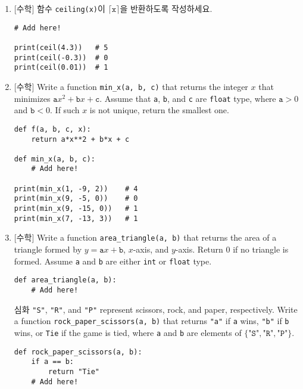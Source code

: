 \documentclass[../main.tex]{subfiles}
\begin{document}
\begin{enumerate}
\item \textsf{[수학]} 함수 \texttt{ceiling(x)}이 $\lceil\texttt{x}\rceil$을
  반환하도록 작성하세요.
\begin{verbatim}
# Add here!

print(ceil(4.3))   # 5
print(ceil(-0.3))  # 0
print(ceil(0.01))  # 1
\end{verbatim}

\item \textsf{[수학]} Write a function \texttt{min\_x(a, b, c)} that returns the integer $x$ that minimizes $\texttt{a}x^2 + \texttt{b}x + \texttt{c}$.
Assume that \texttt{a}, \texttt{b}, and \texttt{c} are \texttt{float} type, where $\texttt{a} > 0$ and $\texttt{b} < 0$.
If such $x$ is not unique, return the smallest one.
\begin{verbatim}
def f(a, b, c, x):
    return a*x**2 + b*x + c

def min_x(a, b, c):
    # Add here!

print(min_x(1, -9, 2))    # 4
print(min_x(9, -5, 0))    # 0
print(min_x(9, -15, 0))   # 1
print(min_x(7, -13, 3))   # 1
\end{verbatim}

\item \textsf{[수학]} Write a function \texttt{area\_triangle(a, b)} that returns the area of a
  triangle formed by $y = \texttt{a}x + \texttt{b}$, $x$-axis, and $y$-axis.
  Return 0 if no triangle is formed. Assume \texttt{a} and \texttt{b} are
  either \texttt{int} or \texttt{float} type.

\begin{verbatim}
def area_triangle(a, b):
    # Add here!

\end{verbatim}

\item[심화] \texttt{"S"}, \texttt{"R"}, and \texttt{"P"} represent scissors, rock,
  and paper, respectively.  Write a function \texttt{rock\_paper\_scissors(a,
  b)} that returns \texttt{"a"} if \texttt{a} wins, \texttt{"b"} if \texttt{b}
  wins, or \texttt{Tie} if the game is tied, where \texttt{a} and \texttt{b}
  are elements of $\{\texttt{"S"}, \texttt{"R"}, \texttt{"P"}\}$.
\begin{verbatim}
def rock_paper_scissors(a, b):
    if a == b:
        return "Tie"
    # Add here!
    

\end{verbatim}
\end{enumerate}
\end{document}
